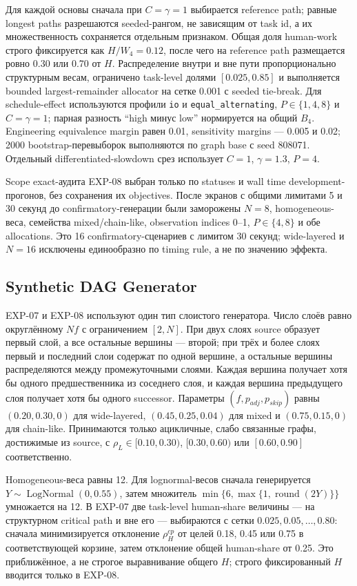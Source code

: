 Для каждой основы сначала при $C=\gamma=1$ выбирается reference path; равные
longest paths разрешаются seeded-рангом, не зависящим от task id, а их
множественность сохраняется отдельным признаком. Общая доля human-work строго
фиксируется как $H/W_4=0.12$, после чего на reference path размещается ровно
0.30 или 0.70 от $H$. Распределение внутри и вне пути пропорционально
структурным весам, ограничено task-level долями $[0.025,0.85]$ и выполняется
bounded largest-remainder allocator на сетке 0.001 с seeded tie-break. Для
schedule-effect используются профили \texttt{io} и
\texttt{equal\_alternating}, $P\in\{1,4,8\}$ и $C=\gamma=1$; парная разность
``high минус low'' нормируется на общий $B_4$. Engineering equivalence margin
равен 0.01, sensitivity margins --- 0.005 и 0.02; 2000 bootstrap-перевыборок
выполняются по graph base с seed 808071. Отдельный differentiated-slowdown
срез использует $C=1$, $\gamma=1.3$, $P=4$.

Scope exact-аудита EXP-08 выбран только по statuses и wall time development-
прогонов, без сохранения их objectives. После экранов с общими лимитами 5 и 30
секунд до confirmatory-генерации были заморожены $N=8$, homogeneous-веса,
семейства mixed/chain-like, observation indices 0--1, $P\in\{4,8\}$ и обе
allocations. Это 16 confirmatory-сценариев с лимитом 30 секунд; wide-layered и
$N=16$ исключены единообразно по timing rule, а не по значению эффекта.

\subsection{Synthetic DAG Generator}

EXP-07 и EXP-08 используют один тип слоистого генератора. Число слоёв равно
округлённому $Nf$ с ограничением $[2,N]$. При двух слоях source образует первый
слой, а все остальные вершины --- второй; при трёх и более слоях первый и
последний слои содержат по одной вершине, а остальные вершины распределяются
между промежуточными слоями.
Каждая вершина получает хотя бы одного предшественника из соседнего слоя, и
каждая вершина предыдущего слоя получает хотя бы одного successor. Параметры
$(f,p_{adj},p_{skip})$ равны $(0.20,0.30,0)$ для wide-layered,
$(0.45,0.25,0.04)$ для mixed и $(0.75,0.15,0)$ для chain-like. Принимаются
только ацикличные, слабо связанные графы, достижимые из source, с
$\rho_L\in[0.10,0.30)$, $[0.30,0.60)$ или $[0.60,0.90]$ соответственно.

Homogeneous-веса равны 12. Для lognormal-весов сначала генерируется
$Y\sim\operatorname{LogNormal}(0,0.55)$, затем множитель
$\min\{6,\max\{1,\operatorname{round}(2Y)\}\}$ умножается на 12. В EXP-07
две task-level human-share величины --- на структурном critical path и вне его
--- выбираются с сетки $0.025,0.05,\ldots,0.80$: сначала минимизируется
отклонение $\rho_H^{cp}$ от целей 0.18, 0.45 или 0.75 в соответствующей
корзине, затем отклонение общей human-share от 0.25. Это приближённое, а не
строгое выравнивание общего $H$; строго фиксированный $H$ вводится только в
EXP-08.

